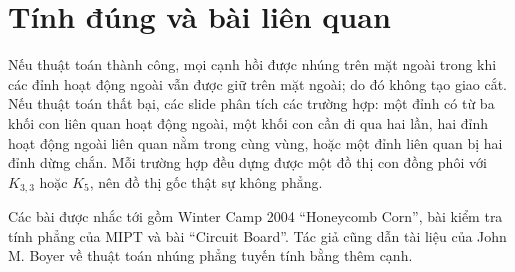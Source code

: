 \documentclass[11pt]{article}
\newcommand{\Kfive}{K_5}
\newcommand{\Kthree}{K_{3,3}}
\begin{document}
\section{Tính đúng và bài liên quan}

Nếu thuật toán thành công, mọi cạnh hồi được nhúng trên mặt ngoài trong khi
các đỉnh hoạt động ngoài vẫn được giữ trên mặt ngoài; do đó không tạo giao
cắt. Nếu thuật toán thất bại, các slide phân tích các trường hợp: một đỉnh
có từ ba khối con liên quan hoạt động ngoài, một khối con cần đi qua hai lần,
hai đỉnh hoạt động ngoài liên quan nằm trong cùng vùng, hoặc một đỉnh liên
quan bị hai đỉnh dừng chắn. Mỗi trường hợp đều dựng được một đồ thị con đồng
phôi với \(\Kthree\) hoặc \(\Kfive\), nên đồ thị gốc thật sự không phẳng.

Các bài được nhắc tới gồm Winter Camp 2004 ``Honeycomb Corn'', bài kiểm tra
tính phẳng của MIPT và bài ``Circuit Board''. Tác giả cũng dẫn tài liệu của
John M. Boyer về thuật toán nhúng phẳng tuyến tính bằng thêm cạnh.
\end{document}

